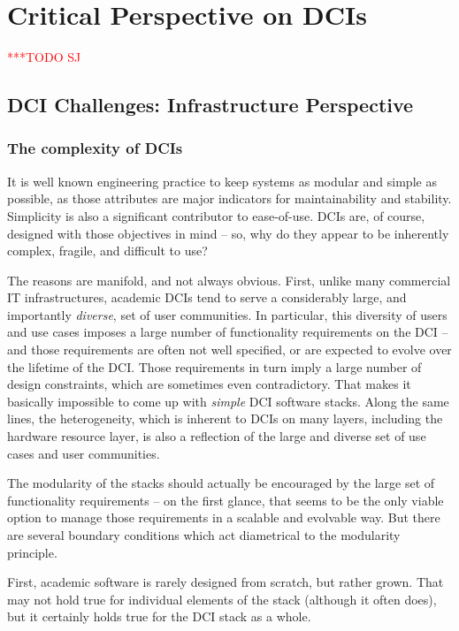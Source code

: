 \documentclass[a4paper,12pt]{article}
\newcommand{\todo}[1]{     {\textcolor{red}  { ***TODO      #1 }}}
\newcommand{\todo}[1]{}
\newcommand{\I}[1]{\textit{#1}}
\begin{document}
% 
\section{Critical Perspective on DCIs}\todo{SJ}


\subsection{DCI Challenges: Infrastructure Perspective}

 \subsubsection{The complexity of DCIs}

  It is well known engineering practice to keep systems as modular and
  simple as possible, as those attributes are major indicators for
  maintainability and stability.  Simplicity is also a significant
  contributor to ease-of-use.  DCIs are, of course, designed with
  those objectives in mind -- so, why do they appear to be inherently
  complex, fragile, and difficult to use?

  The reasons are manifold, and not always obvious.  First, unlike
  many commercial IT infrastructures, academic DCIs tend to serve a
  considerably large, and importantly \I{diverse}, set of user
  communities.  In particular, this diversity of users and use cases
  imposes a large number of functionality requirements on the DCI --
  and those requirements are often not well specified, or are expected
  to evolve over the lifetime of the DCI.  Those requirements in turn
  imply a large number of design constraints, which are sometimes even
  contradictory.  That makes it basically impossible to come up with
  \I{simple} DCI software stacks.  Along the same lines, the
  heterogeneity, which is inherent to DCIs on many layers, including
  the hardware resource layer, is also a reflection of the large and
  diverse set of use cases and user communities.

  The modularity of the stacks should actually be encouraged by the
  large set of functionality requirements -- on the first glance, that
  seems to be the only viable option to manage those requirements in a
  scalable and evolvable way.  But there are several boundary
  conditions which act diametrical to the modularity principle.

  First, academic software is rarely designed from scratch, but rather
  grown.  That may not hold true for individual elements of the stack
  (although it often does), but it certainly holds true for the DCI
  stack as a whole.
\end{document}
